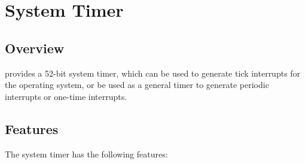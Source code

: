 \documentclass[main\_\_EN.tex]{subfiles}
\begin{document}

\ifglobal
\else
    {\let\clearpage\relax \listoftodos}
    {\let\clearpage\relax \listofdonetodos}
    \tableofcontents
\fi



\hypertarget{systimer}{}
\chapter{System Timer}
\label{mod:systimer}

\section{Overview}

\chipname{} provides a 52-bit system timer, which can be used to generate tick interrupts for the operating system, or be used as a general timer to generate periodic interrupts or one-time interrupts.


\section{Features}

The system timer has the following features:
\end{document}
